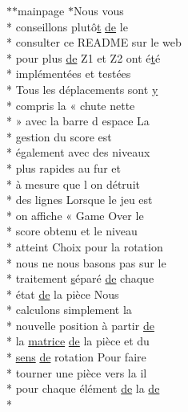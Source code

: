 \begin{DoxyCompactItemize}
$\ast$$\ast$mainpage $\ast$Nous vous \\*
conseillons plutô\hyperlink{gl_8h_a00140d6f5c548b26daf170bf16e86a6d}{t} \hyperlink{mainpage_8dox_ab37fa35e77d95c6d0d0ab620c97c3db8}{de} le \\*
consulter ce R\-E\-A\-D\-M\-E sur le web \\*
pour plus \hyperlink{mainpage_8dox_ab37fa35e77d95c6d0d0ab620c97c3db8}{de} Z1 et Z2 ont é\hyperlink{gl_8h_a00140d6f5c548b26daf170bf16e86a6d}{t}é \\*
implémentées et testées \\*
Tous les déplacements sont \hyperlink{gl_8h_a74d80fd479c0f6d0153c709949a089ef}{y} \\*
compris la « chute nette \\*
» avec la barre d espace La \\*
gestion du score est \\*
également avec des niveaux \\*
plus rapides au fur et \\*
à mesure que l on détruit \\*
des lignes Lorsque le jeu est \\*
on affiche « Game Over le \\*
score obtenu et le niveau \\*
atteint Choix pour la rotation \\*
nous ne nous basons pas sur le \\*
traitement \hyperlink{gl_8h_ad585a1393cfa368fa9dc3d8ebff640d5}{s}éparé \hyperlink{mainpage_8dox_ab37fa35e77d95c6d0d0ab620c97c3db8}{de} chaque \\*
état \hyperlink{mainpage_8dox_ab37fa35e77d95c6d0d0ab620c97c3db8}{de} la pièce Nous \\*
calculons simplement la \\*
nouvelle position à partir \hyperlink{mainpage_8dox_ab37fa35e77d95c6d0d0ab620c97c3db8}{de} \\*
la \hyperlink{mainpage_8dox_af2e36bcdda8980a3e5c1f4013331ee45}{matrice} \hyperlink{mainpage_8dox_ab37fa35e77d95c6d0d0ab620c97c3db8}{de} la pièce et du \\*
\hyperlink{mainpage_8dox_aa08a2c237abaf70493855740d9c5d0c8}{sens} \hyperlink{mainpage_8dox_ab37fa35e77d95c6d0d0ab620c97c3db8}{de} rotation Pour faire \\*
tourner une pièce vers la il \\*
pour chaque élément \hyperlink{mainpage_8dox_ab37fa35e77d95c6d0d0ab620c97c3db8}{de} la \hyperlink{mainpage_8dox_ab37fa35e77d95c6d0d0ab620c97c3db8}{de} \\*
$$
\end{DoxyCompactItemize}
